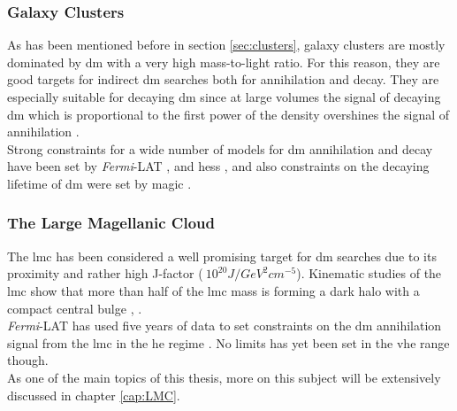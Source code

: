 \documentclass[main.tex]{subfiles}
\begin{document}
\subsubsection{Galaxy Clusters}

As has been mentioned before in section \ref{sec:clusters}, galaxy clusters are mostly dominated by \gls{dm} with a very high mass-to-light ratio. For this reason, they are good targets for indirect \gls{dm}  searches both for annihilation and decay. They are especially suitable for decaying \gls{dm} since at large volumes the signal of decaying \gls{dm} which is proportional to the first power of the density overshines the signal of annihilation \cite{2012DecayingDMCirelli}.\\
Strong constraints for a wide number of models for \gls{dm} annihilation and decay have been set by \textit{Fermi}-LAT \cite{2012DMClustersDecayFermi}, \cite{2010DMClustersFermiAnnihilation} and \gls{hess} \cite{2012DMClustersHess}, and also constraints on the decaying lifetime of \gls{dm} were set by \gls{magic} \cite{2018DMClustersMAGIC}. 

\subsubsection{The Large Magellanic Cloud}

The \gls{lmc} has been considered a well promising target for \gls{dm} searches due to its proximity and rather high J-factor ($~10^{20} J/GeV^{2}cm^{-5}$). Kinematic studies of the \gls{lmc} show that more than half of the \gls{lmc} mass is forming a dark halo with a compact central bulge \cite{2006LMCkinematics}, \cite{1999LMCcentralbulge}.\\
\textit{Fermi}-LAT has used five years of data to set constraints on the \gls{dm} annihilation signal from the \gls{lmc} in the \gls{he} regime \cite{2015LMCDarkMatterFermi}. No limits has yet been set in the \gls{vhe} range though. \\
As one of the main topics of this thesis, more on this subject will be extensively discussed in chapter \ref{cap:LMC}.
\end{document}
